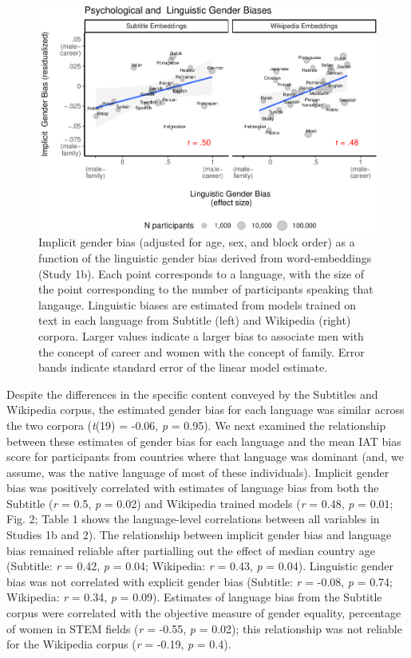 \documentclass[9pt,twocolumn,twoside,lineno]{pnas-new}
\begin{document}
\begin{figure}[t!]
\centering
\includegraphics{iat_lang_files/figure-latex/unnamed-chunk-11-1.pdf}
\caption{\label{fig:unnamed-chunk-11}Implicit gender bias (adjusted for age,
sex, and block order) as a function of the linguistic gender bias
derived from word-embeddings (Study 1b). Each point corresponds to a
language, with the size of the point corresponding to the number of
participants speaking that langauge. Linguistic biases are estimated
from models trained on text in each language from Subtitle (left) and
Wikipedia (right) corpora. Larger values indicate a larger bias to
associate men with the concept of career and women with the concept of
family. Error bands indicate standard error of the linear model
estimate.}
\end{figure}

Despite the differences in the specific content conveyed by the
Subtitles and Wikipedia corpus, the estimated gender bias for each
language was similar across the two corpora (\emph{t}(19) = -0.06,
\emph{p} = 0.95). We next examined the relationship between these
estimates of gender bias for each language and the mean IAT bias score
for participants from countries where that language was dominant (and,
we assume, was the native language of most of these individuals).
Implicit gender bias was positively correlated with estimates of
language bias from both the Subtitle (\emph{r} = 0.5, \emph{p} = 0.02)
and Wikipedia trained models (\emph{r} = 0.48, \emph{p} = 0.01; Fig. 2;
Table 1 shows the language-level correlations between all variables in
Studies 1b and 2). The relationship between implicit gender bias and
language bias remained reliable after partialling out the effect of
median country age (Subtitle: \emph{r} = 0.42, \emph{p} = 0.04;
Wikipedia: \emph{r} = 0.43, \emph{p} = 0.04). Linguistic gender bias was
not correlated with explicit gender bias (Subtitle: \emph{r} = -0.08,
\emph{p} = 0.74; Wikipedia: \emph{r} = 0.34, \emph{p} = 0.09). Estimates
of language bias from the Subtitle corpus were correlated with the
objective measure of gender equality, percentage of women in STEM fields
(\emph{r} = -0.55, \emph{p} = 0.02); this relationship was not reliable
for the Wikipedia corpus (\emph{r} = -0.19, \emph{p} = 0.4).
\end{document}
